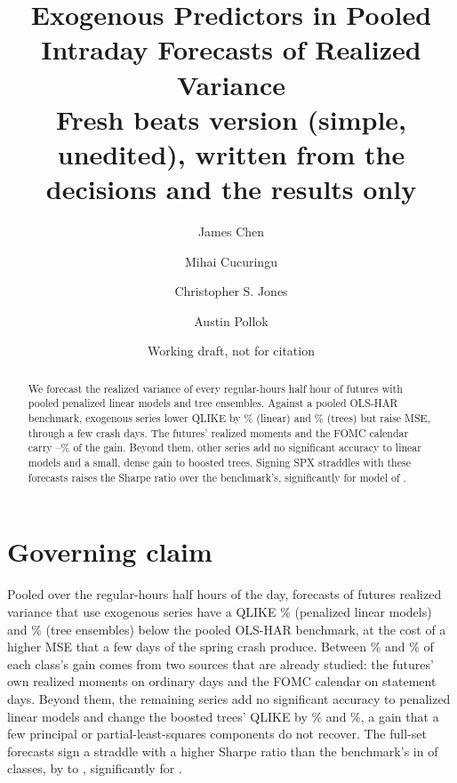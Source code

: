 \title{Exogenous Predictors in Pooled Intraday Forecasts of Realized Variance\\\large Fresh beats version (simple,
unedited), written from the decisions and the results only}
\author{James Chen \and Mihai Cucuringu \and Christopher S. Jones \and Austin Pollok}
\date{Working draft, not for citation}


\maketitle

\begin{abstract}
\noindent We forecast the realized variance of every regular-hours half hour of \SPfh{} futures with pooled penalized
linear models and tree ensembles. Against a pooled OLS-HAR benchmark, \rhdmNSeriesPooled{} exogenous series lower
QLIKE by \rhorVsOlsRedLinRng\% (linear) and \rhorVsOlsRedTreeRng\% (trees) but raise MSE, through a few crash days. The
futures' realized moments and the FOMC calendar carry \rhabBaseShareMin--\rhabBaseShareMax\% of the gain. Beyond them,
other series add no significant accuracy to linear models and a small, dense gain to boosted trees. Signing
\zdte{} SPX straddles with these forecasts raises the Sharpe ratio over the benchmark's, significantly for
\rhemFullVsOlsSigWord{} model of \rhmcsNAltWord.
\end{abstract}

\section*{Governing claim}

Pooled over the \rhorNBars{} regular-hours half hours of the day, forecasts of \SPfh{} futures realized variance that
use \rhdmNSeriesPooled{} exogenous series have a QLIKE \rhorVsOlsRedLinRng\% (penalized linear models) and
\rhorVsOlsRedTreeRng\% (tree ensembles) below the pooled OLS-HAR benchmark, at the cost of a higher MSE that a few days
of the spring crash produce. Between \rhabBaseShareMin\% and \rhabBaseShareMax\% of each class's gain comes from two
sources that are already studied: the futures' own realized moments on ordinary days and the FOMC calendar on statement
days. Beyond them, the remaining \rhbyFLNSeries{} series add no significant accuracy to penalized linear models and
change the boosted trees' QLIKE by \rhabLgbmFullVsAddRmFomcAllPct\% and \rhabXgbFullVsAddRmFomcAllPct\%, a gain that a
few principal or partial-least-squares components do not recover. The full-set forecasts sign a \zdte{} straddle with
a higher Sharpe ratio than the benchmark's in \rhemFullVsOlsPos{} of \rhmcsNAlt{} classes, by \rhemFullVsOlsMin{} to
\rhemFullVsOlsMax, significantly for \rhemFullVsOlsSigWord.


